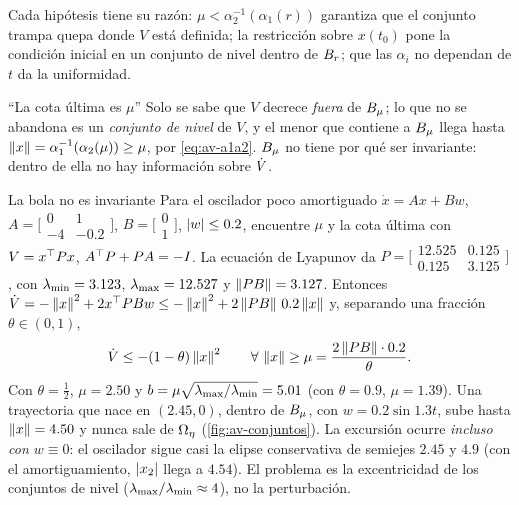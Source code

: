 Cada hipótesis tiene su razón: $\mu<\alpha_2^{-1}(\alpha_1(r))$ garantiza que el conjunto trampa quepa donde $V$ está definida; la restricción sobre $x(t_0)$ pone la condición inicial en un conjunto de nivel dentro de $B_{r}$; que las $\alpha_i$ no dependan de $t$ da la uniformidad.

\begin{trampa}[label=tr:av-cota]{``La cota última es $\mu$''}
Solo se sabe que $V$ decrece \emph{fuera} de $B_{\mu}$; lo que no se abandona es un \emph{conjunto de nivel} de $V$, y el menor que contiene a $B_{\mu}$ llega hasta $\left\lVert x\right\rVert=\alpha_1^{-1}(\alpha_2(\mu))\ge\mu$, por \eqref{eq:av-a1a2}. $B_{\mu}$ no tiene por qué ser invariante: dentro de ella no hay información sobre $\dot V$.
\end{trampa}

\begin{ejemplo}[label=ej:av-oscilador]{La bola no es invariante}
Para el oscilador poco amortiguado $\dot x=Ax+Bw$, $A=\bigl[\begin{smallmatrix}0&1\\-4&-0.2\end{smallmatrix}\bigr]$, $B=\bigl[\begin{smallmatrix}0\\1\end{smallmatrix}\bigr]$, $\left\lvert w\right\rvert\le0.2$, encuentre $\mu$ y la cota última con $V=x^{\top} Px$, $A^{\top} P+PA=-I$.
\solucion La ecuación de Lyapunov da $P=\bigl[\begin{smallmatrix}12.525&0.125\\0.125&3.125\end{smallmatrix}\bigr]$, con $\lambda_{\min}=3.123$, $\lambda_{\max}=12.527$ y $\left\lVert PB\right\rVert=3.127$. Entonces $\dot V=-\left\lVert x\right\rVert^2+2x^{\top} PBw\le-\left\lVert x\right\rVert^2+2\left\lVert PB\right\rVert\,0.2\left\lVert x\right\rVert$ y, separando una fracción $\theta\in(0,1)$,
\[
  \dot V\le-(1-\theta)\left\lVert x\right\rVert^2\qquad\forall\,\left\lVert x\right\rVert\ge\mu=\frac{2\left\lVert PB\right\rVert\cdot0.2}{\theta}.
\]
Con $\theta=\tfrac12$, $\mu=2.50$ y $b=\mu\sqrt{\lambda_{\max}/\lambda_{\min}}=5.01$ (con $\theta=0.9$, $\mu=1.39$). Una trayectoria que nace en $(2.45,0)$, dentro de $B_{\mu}$, con $w=0.2\sin1.3t$, sube hasta $\left\lVert x\right\rVert=4.50$ y nunca sale de $\Omega_{\eta}$ (\cref{fig:av-conjuntos}). La excursión ocurre \emph{incluso con $w\equiv0$}: el oscilador sigue casi la elipse conservativa de semiejes $2.45$ y $4.9$ (con el amortiguamiento, $\left\lvert x_2\right\rvert$ llega a $4.54$). El problema es la excentricidad de los conjuntos de nivel ($\lambda_{\max}/\lambda_{\min}\approx4$), no la perturbación.
\end{ejemplo}

